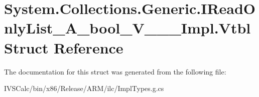 \hypertarget{struct_system_1_1_collections_1_1_generic_1_1_i_read_only_list___a__bool___v_______impl_1_1_vtbl}{}\section{System.\+Collections.\+Generic.\+I\+Read\+Only\+List\+\_\+\+A\+\_\+bool\+\_\+\+V\+\_\+\+\_\+\+\_\+\+Impl.\+Vtbl Struct Reference}
\label{struct_system_1_1_collections_1_1_generic_1_1_i_read_only_list___a__bool___v_______impl_1_1_vtbl}


The documentation for this struct was generated from the following file\+:\begin{DoxyCompactItemize}
\item 
I\+V\+S\+Calc/bin/x86/\+Release/\+A\+R\+M/ilc/Impl\+Types.\+g.\+cs\end{DoxyCompactItemize}
